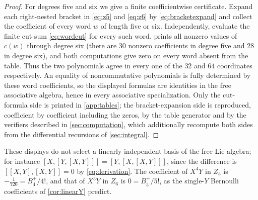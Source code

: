 \begin{proof}
For degrees five and six we give a finite coefficientwise certificate.
Expand each right-nested bracket in \eqref{eq:z5} and \eqref{eq:z6} by
\eqref{eq:bracketexpand} and collect the coefficient of every word $w$ of
length five or six. Independently, evaluate the finite cut sum
\eqref{eq:wordcut} for every such word.  prints all nonzero
values of $c(w)$ through degree six (there are $30$ nonzero coefficients in
degree five and $28$ in degree six), and both computations give zero on
every word absent from the table. Thus the two polynomials agree in every
one of the $32$ and $64$ coordinates respectively. An equality of
noncommutative polynomials is fully determined by these word coefficients,
so the displayed formulas are identities in the free associative algebra,
hence in every associative specialization. Only the cut-formula side is
printed in \cref{app:tables}; the bracket-expansion side is reproduced,
coefficient by coefficient including the zeros, by the table generator and
by the verifiers described in \cref{sec:computation}, which additionally
recompute both sides from the differential recursions of
\cref{sec:integral}.
\end{proof}
These displays do not select a linearly independent basis of the free Lie
algebra; for instance $[X,[Y,[X,Y]]]=[Y,[X,[X,Y]]]$, since the difference is
$[[X,Y],[X,Y]]=0$ by \eqref{eq:derivation}. The coefficient of $X^4Y$ in
$Z_5$ is $-\tfrac1{720}=B_4^+/4!$, and that of $X^5Y$ in $Z_6$ is
$0=B_5^+/5!$, as the single-$Y$ Bernoulli coefficients of
\cref{cor:linearY} predict.
